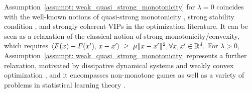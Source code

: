 Assumption~\ref{assumpt: weak_quasi_strong_monotonicity} for $\lambda = 0$ coincides with the well-known notions of quasi-strong monotonicity \citep{loizou2020stochastic}, strong stability condition \citep{mertikopoulos2019learning}, and strongly coherent VIPs \citep{song2020optimistic} in the optimization literature. It can be seen as a relaxation of the classical notion of strong monotonicity/convexity, which requires
$
\langle F(x) - F(x'),\, x - x'\rangle \;\geq\; \mu \|x - x'\|^2, 
 \forall x,x'\in \mathbb{R}^d.
$
For $\lambda > 0$, Assumption~\ref{assumpt: weak_quasi_strong_monotonicity} represents a further relaxation, motivated by dissipative dynamical systems and weakly convex optimization \citep{raginsky2017non, erdogdu2018global}, and it encompasses non-monotone games as well as a variety of problems in statistical learning theory \citep{tan2023online}.

%


